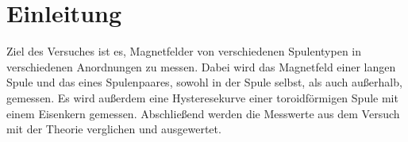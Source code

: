 \section{Einleitung}
\label{sec:Einleitung}
Ziel des Versuches ist es, Magnetfelder von verschiedenen Spulentypen in verschiedenen Anordnungen zu messen.
Dabei wird das Magnetfeld einer langen Spule und das eines Spulenpaares, sowohl in der Spule selbst, als auch
außerhalb, gemessen. Es wird außerdem eine Hysteresekurve einer toroidförmigen Spule mit einem Eisenkern gemessen.
Abschließend werden die Messwerte aus dem Versuch mit der Theorie verglichen und ausgewertet.